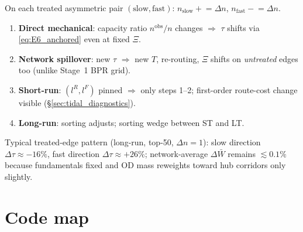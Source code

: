 \documentclass[12pt]{article}
\newcommand{\Wbar}{\bar W}
\newcommand{\obs}{\mathrm{obs}}
\begin{document}
On each treated asymmetric pair $(\text{slow},\text{fast})$:
$n_{\text{slow}}\mathrel{+}=\Delta n$, $n_{\text{fast}}\mathrel{-}=\Delta n$.

\begin{enumerate}[leftmargin=2em]
  \item \textbf{Direct mechanical}: capacity ratio $n^{\obs}/n$ changes $\Rightarrow$
        $\tau$ shifts via \eqref{eq:E6_anchored} even at fixed $\Xi$.
  \item \textbf{Network spillover}: new $\tau$ $\Rightarrow$ new $T$, re-routing,
        $\Xi$ shifts on \emph{untreated} edges too (unlike Stage~1 BPR grid).
  \item \textbf{Short-run}: $(l^R,l^F)$ pinned $\Rightarrow$ only steps 1--2;
        first-order route-cost change visible (§\ref{sec:tidal_diagnostics}).
  \item \textbf{Long-run}: sorting adjusts; sorting wedge between ST and LT.
\end{enumerate}

Typical treated-edge pattern (long-run, top-50, $\Delta n=1$):
slow direction $\Delta\tau\approx -16\%$, fast direction $\Delta\tau\approx +26\%$;
network-average $\Delta\Wbar$ remains $\lesssim 0.1\%$ because fundamentals
fixed and OD mass reweights toward hub corridors only slightly.

\section{Code map}\label{sec:code}
\end{document}

